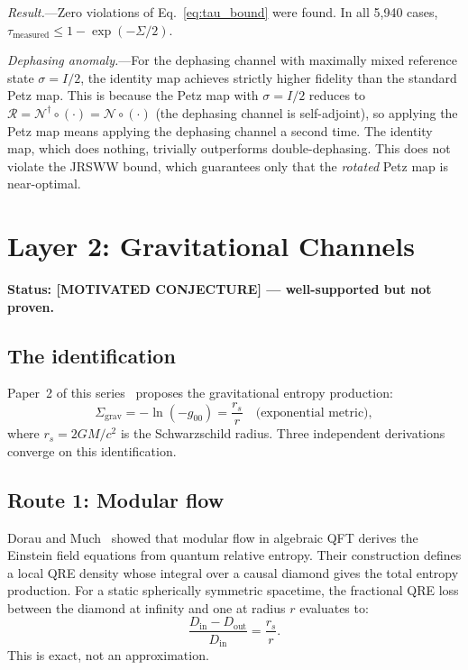 \documentclass[prl,twocolumn,superscriptaddress,longbibliography,floatfix]{revtex4-2}
\newcommand{\Petz}{\mathcal{R}}
\newcommand{\chan}{\mathcal{N}}
\newcommand{\tauasym}{\tau}
\begin{document}
\emph{Result.}---Zero violations of Eq.~\eqref{eq:tau_bound}
were found. In all 5{,}940 cases,
$\tauasym_{\text{measured}} \leq 1 - \exp(-\Sigma/2)$.

\emph{Dephasing anomaly.}---For the dephasing channel with
maximally mixed reference state $\sigma = I/2$, the identity map
achieves strictly higher fidelity than the standard Petz map.
This is because the Petz map with $\sigma = I/2$ reduces to
$\Petz = \chan^\dagger \circ (\cdot) = \chan \circ (\cdot)$
(the dephasing channel is self-adjoint), so applying the Petz map
means applying the dephasing channel a second time. The identity map,
which does nothing, trivially outperforms double-dephasing.
This does not violate the JRSWW bound, which guarantees only
that the \emph{rotated} Petz map is near-optimal.

\section{Layer 2: Gravitational Channels}
\label{sec:layer2}

\noindent\textbf{Status: [MOTIVATED CONJECTURE] --- well-supported
but not proven.}

\subsection{The identification}

Paper~2 of this series~\cite{Paper2} proposes the gravitational
entropy production:
\begin{equation}
\Sigma_{\text{grav}} = -\ln(-g_{00})
= \frac{r_s}{r}
\quad\text{(exponential metric)},
\label{eq:Sigma_grav}
\end{equation}
where $r_s = 2GM/c^2$ is the Schwarzschild radius.
Three independent derivations converge on this identification.

\subsection{Route 1: Modular flow}

Dorau and Much~\cite{DorauMuch2025} showed that modular flow in
algebraic QFT derives the Einstein field equations from quantum
relative entropy. Their construction defines a local QRE density
whose integral over a causal diamond gives the total entropy
production. For a static spherically symmetric spacetime,
the fractional QRE loss between the diamond at infinity and one
at radius $r$ evaluates to:
\begin{equation}
\frac{D_{\text{in}} - D_{\text{out}}}{D_{\text{in}}}
= \frac{r_s}{r}.
\label{eq:modular}
\end{equation}
This is exact, not an approximation.
\end{document}
